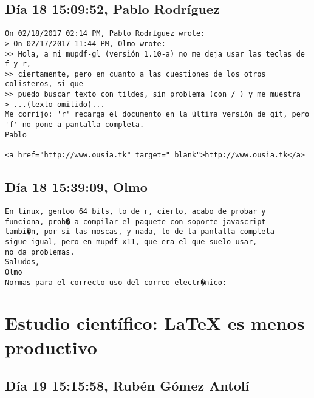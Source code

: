 \documentclass[a4paper,10pt]{article}
\begin{document}
\subsection{Día 18 15:09:52, Pablo Rodríguez}

\begin{lstlisting}
On 02/18/2017 02:14 PM, Pablo Rodríguez wrote:
> On 02/17/2017 11:44 PM, Olmo wrote:
>> Hola, a mi mupdf-gl (versión 1.10-a) no me deja usar las teclas de f y r,
>> ciertamente, pero en cuanto a las cuestiones de los otros colisteros, si que
>> puedo buscar texto con tildes, sin problema (con / ) y me muestra
> ...(texto omitido)...
Me corrijo: 'r' recarga el documento en la última versión de git, pero
'f' no pone a pantalla completa.
Pablo
-- 
<a href="http://www.ousia.tk" target="_blank">http://www.ousia.tk</a>

\end{lstlisting}

\subsection{Día 18 15:39:09, Olmo}

\begin{lstlisting}
En linux, gentoo 64 bits, lo de r, cierto, acabo de probar y
funciona, prob� a compilar el paquete con soporte javascript
tambi�n, por si las moscas, y nada, lo de la pantalla completa
sigue igual, pero en mupdf x11, que era el que suelo usar,
no da problemas.
Saludos,
Olmo
Normas para el correcto uso del correo electr�nico:

\end{lstlisting}
\section{Estudio científico: LaTeX es menos productivo}

\subsection{Día 19 15:15:58, Rubén Gómez Antolí}
\end{document}
